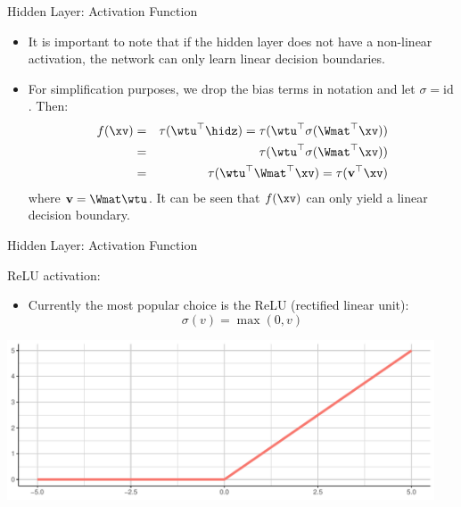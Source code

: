 \documentclass[11pt,compress,t,notes=noshow]{beamer}
\newenvironment{knitrout}{}{} %
\newenvironment{blocki}[1]   %
{
 \begin{block}{#1}\begin{itemize}
}
{
\end{itemize}\end{block}
}
\begin{document}
\begin{frame} {Hidden Layer: Activation Function}
  \begin{itemize}
    \item It is important to note that if the hidden layer does not have a non-linear activation, the network can only learn linear decision boundaries.
    \item For simplification purposes, we drop the bias terms in notation and let $\sigma = \text{id}$. Then:
    \begin{eqnarray*}
        f(\xv) & = & \tau(\wtu^\top \hidz) = \tau(\wtu^\top \sigma(\Wmat^\top \xv)) \\
         & = & \tau(\wtu^\top \sigma(\Wmat^\top \xv)) \\
         & = & \tau(\wtu^\top\Wmat^\top \xv) = \tau(\mathbf{v}^\top \xv)
      \end{eqnarray*}
      where $ \mathbf{v} = \Wmat\wtu$. It can be seen that $f(\xv)$ can only yield a linear decision boundary.
  \end{itemize}
\end{frame}

\begin{frame} {Hidden Layer: Activation Function}
  \begin{blocki}{ReLU activation:}
    \item Currently the most popular choice is the ReLU (rectified linear unit):
    $$ \sigma (v) = \max(0,v) $$
  \end{blocki}
\begin{knitrout}\scriptsize
{}\color{fgcolor}

{\centering \includegraphics[width=0.95\textwidth]{figure/unnamed-chunk-2-1} 

}



\end{knitrout}
\end{frame}
\end{document}

